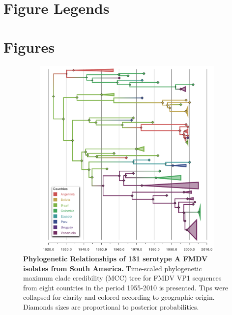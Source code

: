 \documentclass[10pt]{article}
\begin{document}
\section*{Figure Legends}
\newpage
\section{Figures}
\begin{figure}[!ht]
\begin{center}
\includegraphics[width=15cm,height=10cm]{FIGURES/A.pdf}
\end{center}
\caption{
{\bf Phylogenetic Relationships of 131 serotype A FMDV isolates from South America.} Time-scaled phylogenetic maximum clade credibility (MCC) tree for FMDV VP1 sequences from eight countries in the period 1955-2010 is presented. Tips were collapsed for clarity and colored according to geographic origin. Diamonds sizes are proportional to posterior probabilities.\\
}
\label{fig:Atree}
\end{figure}
\newpage
\end{document}
